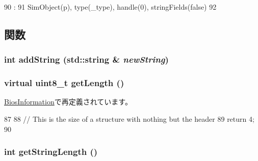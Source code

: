 \begin{DoxyCode}
90                                                                       :
91     SimObject(p), type(_type), handle(0), stringFields(false)
92 {}

\end{DoxyCode}


\subsection{関数}
\hypertarget{classX86ISA_1_1SMBios_1_1SMBiosStructure_a860fda500f787a505416d7b8d240d2b2}{
\subsubsection[{addString}]{\setlength{\rightskip}{0pt plus 5cm}int addString (std::string \& {\em newString})}}
\label{classX86ISA_1_1SMBios_1_1SMBiosStructure_a860fda500f787a505416d7b8d240d2b2}
\hypertarget{classX86ISA_1_1SMBios_1_1SMBiosStructure_a63b44afdbd3bcc5b87e2e443ceaa4d61}{
\subsubsection[{getLength}]{\setlength{\rightskip}{0pt plus 5cm}virtual uint8\_\-t getLength ()}}
\label{classX86ISA_1_1SMBios_1_1SMBiosStructure_a63b44afdbd3bcc5b87e2e443ceaa4d61}


\hyperlink{classX86ISA_1_1SMBios_1_1BiosInformation_a51bcc6f780d66596dbc3bedd845bc013}{BiosInformation}で再定義されています。


\begin{DoxyCode}
87     {
88         // This is the size of a structure with nothing but the header
89         return 4;
90     }
\end{DoxyCode}
\hypertarget{classX86ISA_1_1SMBios_1_1SMBiosStructure_a0107eb1f73c5daf86f74ebc0a38e7467}{
\subsubsection[{getStringLength}]{\setlength{\rightskip}{0pt plus 5cm}int getStringLength ()}}
\label{classX86ISA_1_1SMBios_1_1SMBiosStructure_a0107eb1f73c5daf86f74ebc0a38e7467}



